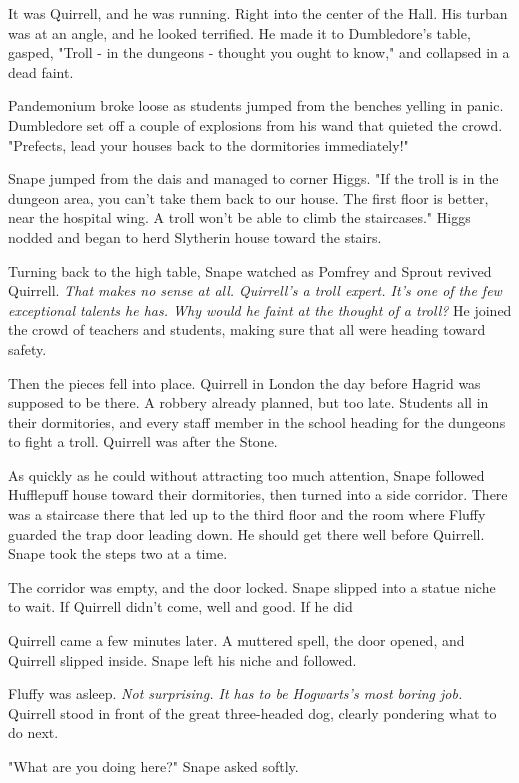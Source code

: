 It was Quirrell, and he was running. Right into the center of the Hall. His turban was at an angle, and he looked terrified. He made it to Dumbledore's table, gasped, "Troll - in the dungeons - thought you ought to know," and collapsed in a dead faint.

Pandemonium broke loose as students jumped from the benches yelling in panic. Dumbledore set off a couple of explosions from his wand that quieted the crowd. "Prefects, lead your houses back to the dormitories immediately!"

Snape jumped from the dais and managed to corner Higgs. "If the troll is in the dungeon area, you can't take them back to our house. The first floor is better, near the hospital wing. A troll won't be able to climb the staircases." Higgs nodded and began to herd Slytherin house toward the stairs.

Turning back to the high table, Snape watched as Pomfrey and Sprout revived Quirrell. \emph{That makes no sense at all. Quirrell's a troll expert. It's one of the few exceptional talents he has. Why would he faint at the thought of a troll?} He joined the crowd of teachers and students, making sure that all were heading toward safety.

Then the pieces fell into place. Quirrell in London the day before Hagrid was supposed to be there. A robbery already planned, but too late. Students all in their dormitories, and every staff member in the school heading for the dungeons to fight a troll. Quirrell was after the Stone.

As quickly as he could without attracting too much attention, Snape followed Hufflepuff house toward their dormitories, then turned into a side corridor. There was a staircase there that led up to the third floor and the room where Fluffy guarded the trap door leading down. He should get there well before Quirrell. Snape took the steps two at a time.

The corridor was empty, and the door locked. Snape slipped into a statue niche to wait. If Quirrell didn't come, well and good. If he did{\el}

Quirrell came a few minutes later. A muttered spell, the door opened, and Quirrell slipped inside. Snape left his niche and followed.

Fluffy was asleep. \emph{Not surprising. It has to be Hogwarts's most boring job.} Quirrell stood in front of the great three-headed dog, clearly pondering what to do next.

"What are you doing here?" Snape asked softly.

